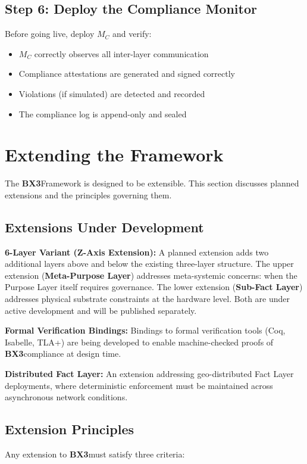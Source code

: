\documentclass[12pt]{article}
\newcommand{\bxthree}{\textbf{BX3}}
\begin{document}
\subsection{Step 6: Deploy the Compliance Monitor}
Before going live, deploy $M_C$ and verify:

\begin{itemize}
\item $M_C$ correctly observes all inter-layer communication
\item Compliance attestations are generated and signed correctly
\item Violations (if simulated) are detected and recorded
\item The compliance log is append-only and sealed
\end{itemize}

\section{Extending the Framework}
\label{sec:extensions}

The \bxthree Framework is designed to be extensible. This section discusses planned extensions and the principles governing them.

\subsection{Extensions Under Development}

\textbf{6-Layer Variant (Z-Axis Extension):} A planned extension adds two additional layers above and below the existing three-layer structure. The upper extension (\textbf{Meta-Purpose Layer}) addresses meta-systemic concerns: when the Purpose Layer itself requires governance. The lower extension (\textbf{Sub-Fact Layer}) addresses physical substrate constraints at the hardware level. Both are under active development and will be published separately.

\textbf{Formal Verification Bindings:} Bindings to formal verification tools (Coq, Isabelle, TLA+) are being developed to enable machine-checked proofs of \bxthree compliance at design time.

\textbf{Distributed Fact Layer:} An extension addressing geo-distributed Fact Layer deployments, where deterministic enforcement must be maintained across asynchronous network conditions.

\subsection{Extension Principles}
Any extension to \bxthree must satisfy three criteria:
\end{document}
